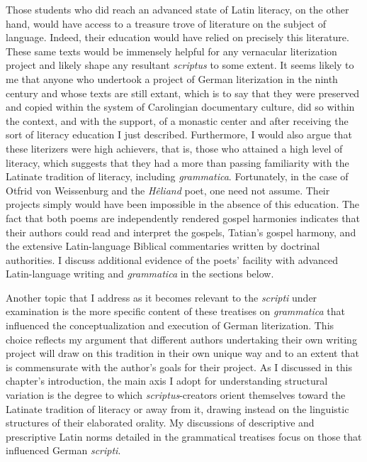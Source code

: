 Those students who did reach an advanced state of Latin literacy, on the other hand, would have access to a treasure trove of literature on the subject of language. Indeed, their education would have relied on precisely this literature. These same texts would be immensely helpful for any vernacular literization project and likely shape any resultant \textit{scriptus} to some extent. It seems likely to me that anyone who undertook a project of German literization in the ninth century and whose texts are still extant, which is to say that they were preserved and copied within the system of Carolingian documentary culture, did so within the context, and with the support, of a monastic center and after receiving the sort of literacy education I just described.  Furthermore, I would also argue that these literizers were high achievers, that is, those who attained a high level of literacy, which suggests that they had a more than passing familiarity with the Latinate tradition of literacy, including \textit{grammatica}. Fortunately, in the case of Otfrid von Weissenburg and the \textit{Hêliand} poet, one need not assume. Their projects simply would have been impossible in the absence of this education. The fact that both poems are independently rendered gospel harmonies indicates that their authors could read and interpret the gospels, Tatian’s gospel harmony, and the extensive Latin-language Biblical commentaries written by doctrinal authorities. I discuss additional evidence of the poets’ facility with advanced Latin-language writing and \textit{grammatica} in the sections below.

  Another topic that I address as it becomes relevant to the \textit{scripti} under examination is the more specific content of these treatises on \textit{grammatica} that influenced the conceptualization and execution of German literization. This choice reflects my argument that different authors undertaking their own writing project will draw on this tradition in their own unique way and to an extent that is commensurate with the author’s goals for their project. As I discussed in this chapter’s introduction, the main axis I adopt for understanding structural variation is the degree to which \textit{scriptus}{}-creators orient themselves toward the Latinate tradition of literacy or away from it, drawing instead on the linguistic structures of their elaborated orality. My discussions of descriptive and prescriptive Latin norms detailed in the grammatical treatises focus on those that influenced German \textit{scripti}.

